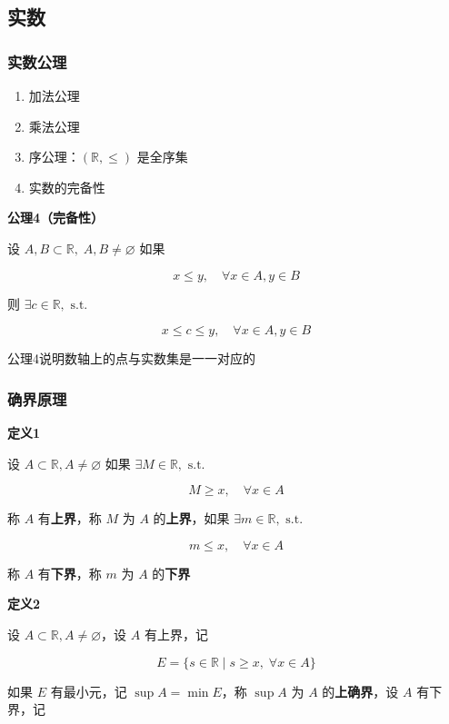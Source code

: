 \subsection{实数}\label{ux5b9eux6570}

\subsubsection{实数公理}\label{ux5b9eux6570ux516cux7406}

\begin{enumerate}
\def\labelenumi{\arabic{enumi}.}
\tightlist
\item
  加法公理
\item
  乘法公理
\item
  序公理：\((\mathbb{R},\leq)\) 是全序集
\item
  实数的完备性
\end{enumerate}

\textbf{公理4（完备性）}

设 \(A,B\subset\mathbb{R},\;A,B\neq\varnothing\) 如果

\[
x\leq y,\quad\forall x \in A,y\in B
\]

则 \(\exists c\in\mathbb{R},\text{ s.t. }\)

\[
x\leq c\leq y,\quad \forall x \in A,y\in B
\]

公理4说明数轴上的点与实数集是一一对应的

\subsubsection{确界原理}\label{ux786eux754cux539fux7406}

\textbf{定义1}

设 \(A\subset\mathbb{R},A\neq\varnothing\) 如果
\(\exists M\in \mathbb{R},\text{ s.t. }\)

\[
M\geq x,\quad \forall x \in A
\]

称 \(A\) 有\textbf{上界}，称 \(M\) 为 \(A\) 的\textbf{上界}，如果
\(\exists m\in\mathbb{R},\text{ s.t. }\)

\[
m\leq x,\quad \forall x \in A
\]

称 \(A\) 有\textbf{下界}，称 \(m\) 为 \(A\) 的\textbf{下界}

\textbf{定义2}

设 \(A\subset \mathbb{R}, A\neq\varnothing\)，设 \(A\) 有上界，记

\[
E=\{ s \in\mathbb{R}\mid s\geq x,\; \forall x \in A \}
\]

如果 \(E\) 有最小元，记 \(\sup A=\min E\)，称 \(\sup A\) 为 \(A\)
的\textbf{上确界}，设 \(A\) 有下界，记

